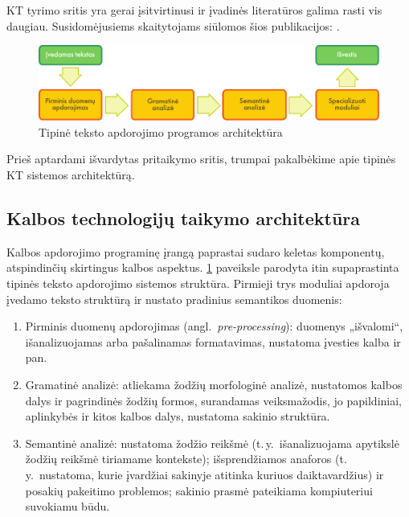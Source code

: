 \begin{multicols}{2}
KT tyrimo sritis yra gerai įsitvirtinusi ir įvadinės literatūros galima rasti vis daugiau. Susidomėjusiems skaitytojams siūlomos šios publikacijos:  \cite{carstensen-etal1, jurafsky-martin01, manning-schuetze1, lt-world1, lt-survey1}.

\begin{figure}[hb]
  \center
  \includegraphics[width=\textwidth]{../_media/lithuanian/text_processing_app_architecture}
  \caption{Tipinė teksto apdorojimo programos architektūra}
  \label{fig:textprocessingarch_de}
\end{figure}

Prieš aptardami išvardytas pritaikymo sritis, trumpai pakalbėkime apie tipinės KT sistemos architektūrą.  

\subsection{Kalbos technologijų taikymo architektūra}

Kalbos apdorojimo programinę įrangą paprastai sudaro keletas komponentų, atspindinčių skirtingus kalbos aspektus. \ref{fig:textprocessingarch_de} paveiksle parodyta itin supaprastinta tipinės teksto apdorojimo sistemos struktūra. Pirmieji trys moduliai apdoroja įvedamo teksto struktūrą ir nustato pradinius semantikos duomenis:

\begin{enumerate}
\item Pirminis duomenų apdorojimas (angl.~\textit{pre-processing}):  duomenys „išvalomi“, išanalizuojamas arba pašalinamas formatavimas, nustatoma įvesties kalba ir pan.
\item Gramatinė analizė: atliekama žodžių morfologinė analizė, nustatomos kalbos dalys ir pagrindinės žodžių formos, surandamas veiksmažodis, jo papildiniai, aplinkybės ir kitos kalbos dalys, nustatoma sakinio struktūra.
\item Semantinė analizė: nustatoma žodžio reikšmė (t.\,y.~išanalizuojama apytikslė žodžių reikšmė tiriamame kontekste); išsprendžiamos anaforos (t.\,y.~nustatoma, kurie įvardžiai sakinyje atitinka kuriuos daiktavardžius) ir posakių pakeitimo problemos; sakinio prasmė pateikiama kompiuteriui suvokiamu būdu.
\end{enumerate}


\end{multicols}
